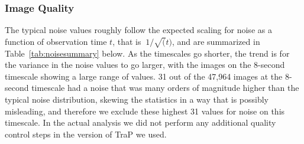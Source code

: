 \documentclass[12pt]{article}
\begin{document}
\subsubsection{Image Quality}

The typical noise values roughly follow the expected scaling for noise as a function of observation time $t$, that is $~1/\sqrt(t)$, and are summarized in Table~\ref{tab:noisesummary} below. As the timescales go shorter, the trend is for the variance in the noise values to go larger, with the images on the 8-second timescale showing a large range of values. 31 out of the 47,964 images at the 8-second timescale had a noise that was many orders of magnitude higher than the typical noise distribution, skewing the statistics in a way that is possibly misleading, and therefore we exclude these highest 31 values for noise on this timescale. In the actual analysis we did not perform any additional quality control steps in the version of TraP we used. 
\end{document}
